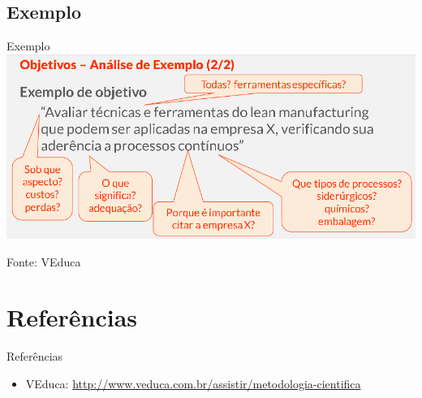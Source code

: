 \documentclass{beamer}
\begin{document}
\subsection{Exemplo}

\begin{frame}{Exemplo}
  \includegraphics[width=1.15\textwidth]{ProjetoI/objetivo-verbos}

  Fonte: VEduca
\end{frame}

\section{Referências}

\begin{frame}{Referências}
  \begin{itemize}
  \item VEduca: \url{http://www.veduca.com.br/assistir/metodologia-cientifica}
  \end{itemize}
\end{frame}
\end{document}
